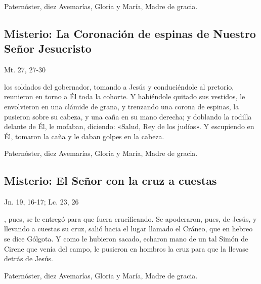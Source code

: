 \documentclass[./main.tex]{subfiles}
\newcounter{sorrowful-counter}
\begin{document}
\begin{center}
      Paternóster, diez Avemarías, Gloria y María, Madre de gracia.
\end{center}

\subsection*{ Misterio: La Coronación de espinas de Nuestro Señor Jesucristo}
\begin{flushright}
      {\color{red}Mt. 27, 27-30}
\end{flushright}
 los soldados del gobernador, tomando a Jesús y conduciéndole al pretorio, reunieron en torno a Él toda la cohorte. Y habiéndole quitado sus vestidos, 
le envolvieron en una clámide de grana, y trenzando una corona de espinas, la pusieron sobre su cabeza, y una caña en su mano derecha; y doblando la rodilla delante de Él, 
le mofaban, diciendo: «Salud, Rey de los judíos». Y escupiendo en Él, tomaron la caña y le daban golpes en la cabeza.

\begin{center}
      Paternóster, diez Avemarías, Gloria y María, Madre de gracia.
\end{center}

\subsection*{ Misterio: El Señor con la cruz a cuestas}
\begin{flushright}
      {\color{red}Jn. 19, 16-17; Lc. 23, 26}
\end{flushright}
, pues, se le entregó para que fuera crucificando. Se apoderaron, pues, de Jesús, y llevando a cuestas su cruz, salió hacia el lugar llamado el Cráneo, 
que en hebreo se dice Gólgota. Y como le hubieron sacado, echaron mano de un tal Simón de Cirene que venía del campo, le pusieron en hombros la cruz para que la llevase detrás de Jesús.

\begin{center}
      Paternóster, diez Avemarías, Gloria y María, Madre de gracia.
\end{center}

\end{document}

